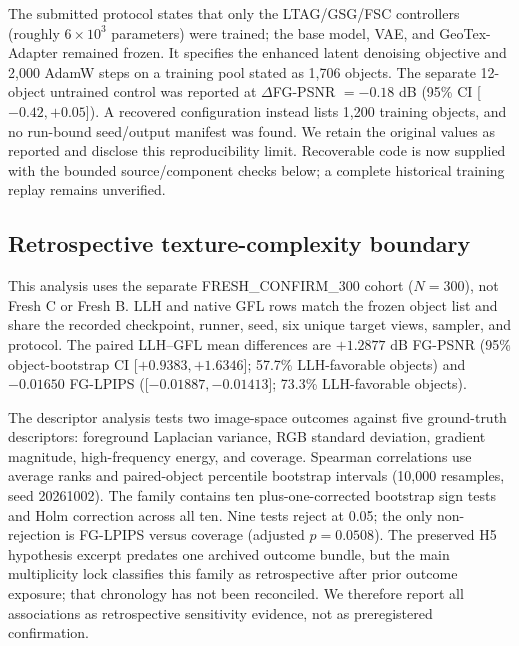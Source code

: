 \documentclass[11pt]{article}
\begin{document}
The submitted protocol states that only the LTAG/GSG/FSC controllers (roughly $6\times10^3$ parameters) were trained; the base model, VAE, and GeoTex-Adapter remained frozen. It specifies the enhanced latent denoising objective and 2,000 AdamW steps on a training pool stated as 1,706 objects. The separate 12-object untrained control was reported at $\Delta$FG-PSNR $=-0.18$ dB (95\% CI [$-0.42,+0.05$]). A recovered configuration instead lists 1,200 training objects, and no run-bound seed/output manifest was found. We retain the original values as reported and disclose this reproducibility limit. Recoverable code is now supplied with the bounded source/component checks below; a complete historical training replay remains unverified.

\subsection*{Retrospective texture-complexity boundary}
This analysis uses the separate FRESH\_CONFIRM\_300 cohort ($N=300$), not Fresh C or Fresh B. LLH and native GFL rows match the frozen object list and share the recorded checkpoint, runner, seed, six unique target views, sampler, and protocol. The paired LLH--GFL mean differences are $+1.2877$ dB FG-PSNR (95\% object-bootstrap CI [$+0.9383,+1.6346$]; 57.7\% LLH-favorable objects) and $-0.01650$ FG-LPIPS ([$-0.01887,-0.01413$]; 73.3\% LLH-favorable objects).

The descriptor analysis tests two image-space outcomes against five ground-truth descriptors: foreground Laplacian variance, RGB standard deviation, gradient magnitude, high-frequency energy, and coverage. Spearman correlations use average ranks and paired-object percentile bootstrap intervals (10,000 resamples, seed 20261002). The family contains ten plus-one-corrected bootstrap sign tests and Holm correction across all ten. Nine tests reject at 0.05; the only non-rejection is FG-LPIPS versus coverage (adjusted $p=0.0508$). The preserved H5 hypothesis excerpt predates one archived outcome bundle, but the main multiplicity lock classifies this family as retrospective after prior outcome exposure; that chronology has not been reconciled. We therefore report all associations as retrospective sensitivity evidence, not as preregistered confirmation.
\end{document}
